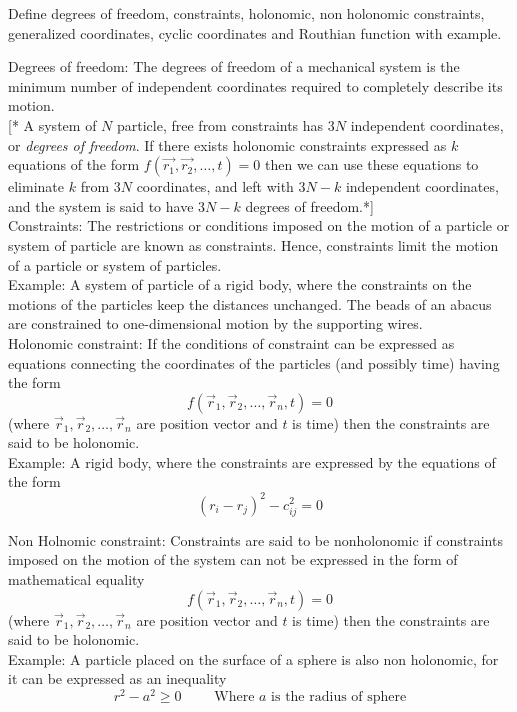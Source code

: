 \documentclass[12pt]{article}
\begin{document}
\begin{prob}{1}
    Define degrees of freedom, constraints, holonomic, non holonomic constraints, generalized coordinates, cyclic coordinates and Routhian function with example.
\end{prob}
\begin{soln}
    Degrees of freedom: The degrees of freedom of a mechanical system is the minimum number of independent coordinates required to completely describe its motion.\\


    {[* 
    A system of \(N\) particle, free from constraints has \(3N\) independent coordinates, or \emph{degrees of freedom}. If there exists holonomic constraints expressed as \(k\) equations of the form \(f(\vec{r_1},\vec{r_2},\dots,t)=0\) then we can use these equations to eliminate \(k\) from \(3N\) coordinates, and left with \(3N-k\) independent coordinates, and the system is said to have \(3N-k\) degrees of freedom.*]}\\


    Constraints: The restrictions or conditions imposed on the motion of a particle or system of particle are known as constraints. Hence, constraints limit the motion of a particle or system of particles.\\
    Example: A system of particle of a rigid body, where the constraints on the motions of the particles keep the distances unchanged. The beads of an abacus are constrained to one-dimensional motion by the supporting wires.\\

    Holonomic constraint: If the conditions of constraint can be expressed as equations connecting the coordinates of the particles (and possibly time) having the form
    \[f(\vec{r}_1,\vec{r}_2,\dots,\vec{r}_n,t)=0\]
    (where \(\vec{r}_1,\vec{r}_2,\dots,\vec{r}_n\) are position vector and \(t\) is time) then the constraints are said to be holonomic.\\
    Example: A rigid body, where the constraints are expressed by the equations of the form
    \[(r_i - r_j)^2 - c_{ij}^2=0\]
    
    Non Holnomic constraint: Constraints are said to be nonholonomic if constraints imposed on the
    motion of the system can not be expressed in the form of mathematical equality
    \[f(\vec{r}_1,\vec{r}_2,\dots,\vec{r}_n,t)=0\]
    (where \(\vec{r}_1,\vec{r}_2,\dots,\vec{r}_n\) are position vector and \(t\) is time) then the constraints are said to be holonomic.\\
    Example: A particle placed on the surface of a sphere is also non holonomic, for it can be expressed as an inequality
    \[r^2-a^2\geq 0 \qquad\text{ Where \(a\) is the radius of sphere}\]
    

\end{soln}
\end{document}
